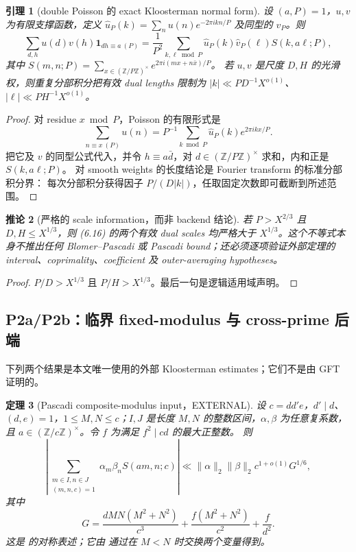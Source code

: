 \documentclass[11pt,a4paper]{ctexart}
\newtheorem{theorem}{定理}[section]
\newtheorem{lemma}[theorem]{引理}
\newtheorem{corollary}[theorem]{推论}
\theoremstyle{definition}
\newcommand{\1}{\mathbf 1}
\newcommand{\EXTERNAL}{\textcolor{blue!70!black}{\textsf{EXTERNAL}}}
\begin{document}
\begin{lemma}[double Poisson 的 exact Kloosterman normal form]\label{lem:double-poisson}
设 $(a,P)=1$，$u,v$ 为有限支撑函数，定义
\(
\widehat u_P(k)=\sum_nu(n)e^{-2\pi i kn/P}
\)
及同型的 $\widehat v_P$。则
\[
\sum_{d,h}u(d)v(h)\mathbf1_{dh\equiv a\ (P)}
=\frac1{P^2}\sum_{k,\ell\bmod P}
 \widehat u_P(k)\widehat v_P(\ell)S(k,a\ell;P),       \tag{6.16}
\]
其中
$S(m,n;P)=\sum_{x\in(\mathbb Z/P\mathbb Z)^\times}
e^{2\pi i(mx+n\bar x)/P}$。
若 $u,v$ 是尺度 $D,H$ 的光滑权，则重复分部积分把有效 dual lengths 限制为
$|k|\ll P D^{-1}X^{o(1)}$、$|\ell|\ll P H^{-1}X^{o(1)}$。
\end{lemma}

\begin{proof}
对 residue $x\bmod P$，Poisson 的有限形式是
\[
\sum_{n\equiv x\ (P)}u(n)=P^{-1}\sum_{k\bmod P}
\widehat u_P(k)e^{2\pi ikx/P}.                         \tag{6.17}
\]
把它及 $v$ 的同型公式代入，并令 $h\equiv a\bar d$，对
$d\in(\mathbb Z/P\mathbb Z)^\times$ 求和，内和正是 $S(k,a\ell;P)$。
对 smooth weights 的长度结论是 Fourier transform 的标准分部积分界：
每次分部积分获得因子 $P/(D|k|)$，任取固定次数即可截断到所述范围。
\end{proof}

\begin{corollary}[严格的 scale information，而非 backend 结论]
若 $P>X^{2/3}$ 且 $D,H\le X^{1/3}$，则 (6.16) 的两个有效 dual scales
均严格大于 $X^{1/3}$。这个不等式本身不推出任何 Blomer--Pascadi 或
Pascadi bound；还必须逐项验证外部定理的 interval、coprimality、coefficient
及 outer-averaging hypotheses。
\end{corollary}

\begin{proof}
$P/D>X^{1/3}$ 且 $P/H>X^{1/3}$。最后一句是逻辑适用域声明。
\end{proof}

\subsection{P2a/P2b：临界 fixed-modulus 与 cross-prime 后端}

下列两个结果是本文唯一使用的外部 Kloosterman estimates；它们不是由 GFT
证明的。

\begin{theorem}[Pascadi composite-modulus input，\EXTERNAL]\label{thm:pascadi}
设 $c=dd'e$，$d'\mid d$、$(d,e)=1$，$1\le M,N\le c$；$I,J$ 是长度
$M,N$ 的整数区间，$\alpha,\beta$ 为任意复系数，且
$a\in(\mathbb Z/c\mathbb Z)^\times$。令 $f$ 为满足 $f^2\mid cd$ 的最大正整数。
则
\[
\left|\sum_{\substack{m\in I,n\in J\\(m,n,c)=1}}
\alpha_m\beta_nS(am,n;c)\right|
\ll \|\alpha\|_2\|\beta\|_2c^{1+o(1)}G^{1/6},       \tag{6.18}
\]
其中
\[
G=\frac{dMN(M^2+N^2)}{c^3}
 +\frac{f(M^2+N^2)}{c^2}+\frac f{d^2}.                \tag{6.19}
\]
这是 \cite[Theorem 5.4]{BP2026} 的对称表述；它由
\cite[Theorem 7.1]{Pascadi2026} 通过在 $M<N$ 时交换两个变量得到。
\end{theorem}
\end{document}
